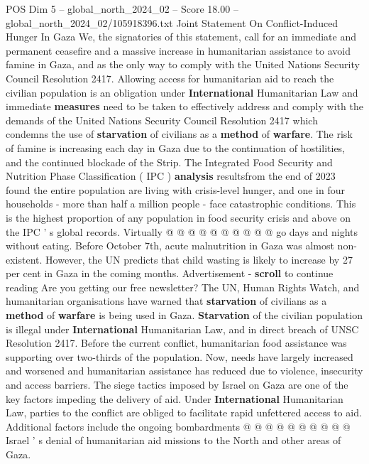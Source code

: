 \begin{textsample}{POS Dim 5 – global\_north\_2024\_02 – Score 18.00 – global\_north\_2024\_02/105918396.txt}  \label{ex:f5_pos_236}
Joint Statement On Conflict-Induced Hunger In Gaza We, the signatories of this statement, call for an immediate and permanent ceasefire and a massive increase in humanitarian assistance to avoid famine in Gaza, and as the only way to comply with the United Nations Security Council Resolution 2417.
Allowing access for humanitarian aid to reach the civilian population is an obligation under \textbf{International} Humanitarian Law and immediate \textbf{measures} need to be taken to effectively address and comply with the demands of the United Nations Security Council Resolution 2417 which condemns the use of \textbf{starvation} of civilians as a \textbf{method} of \textbf{warfare}.
The risk of famine is increasing each day in Gaza due to the continuation of hostilities, and the continued blockade of the Strip.
The Integrated Food Security and Nutrition Phase Classification ( IPC ) \textbf{analysis} resultsfrom the end of 2023 found the entire population are living with crisis-level hunger, and one in four households - more than half a million people - face catastrophic conditions.
This is the highest proportion of any population in food security crisis and above on the IPC ' s global records.
Virtually @ @ @ @ @ @ @ @ @ @ go days and nights without eating.
Before October 7th, acute malnutrition in Gaza was almost non-existent.
However, the UN predicts that child wasting is likely to increase by 27 per cent in Gaza in the coming months.
Advertisement - \textbf{scroll} to continue reading Are you getting our free newsletter?
The UN, Human Rights Watch, and humanitarian organisations have warned that \textbf{starvation} of civilians as a \textbf{method} of \textbf{warfare} is being used in Gaza. \textbf{Starvation} of the civilian population is illegal under \textbf{International} Humanitarian Law, and in direct breach of UNSC Resolution 2417.
Before the current conflict, humanitarian food assistance was supporting over two-thirds of the population.
Now, needs have largely increased and worsened and humanitarian assistance has reduced due to violence, insecurity and access barriers.
The siege tactics imposed by Israel on Gaza are one of the key factors impeding the delivery of aid.
Under \textbf{International} Humanitarian Law, parties to the conflict are obliged to facilitate rapid unfettered access to aid.
Additional factors include the ongoing bombardments @ @ @ @ @ @ @ @ @ @ Israel ' s denial of humanitarian aid missions to the North and other areas of Gaza.

\end{textsample}
